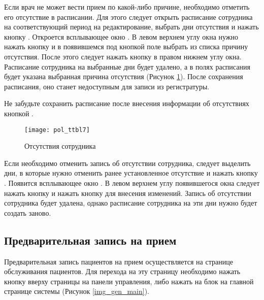 Если врач не может вести прием по какой-либо причине, необходимо отметить его отсутствие в расписании. Для этого следует открыть расписание сотрудника на соответствующий период на редактирование, выбрать дни отсутствия и нажать кнопку . Откроется всплывающее окно . В левом верхнем углу окна нужно нажать кнопку  и в появившемся под кнопкой поле выбрать из списка причину отсутствия. После этого следует нажать кнопку  в правом нижнем углу окна. Расписание сотрудника на выбранные дни будет удалено, а в полях расписания будет указана выбранная причина отсутствия (Рисунок \ref{img_pol_ttbl7}). После сохранения расписания, оно станет недоступным для записи из регистратуры.

\begin{vnim}
 Не забудьте сохранить расписание после внесения информации об отсутствиях кнопкой .
\end{vnim} 

\begin{figure}[ht]\centering
 \texttt{[image: pol\_ttbl7]}
 \caption{Отсутствия сотрудника}
 \label{img_pol_ttbl7}
\end{figure}

Если необходимо отменить запись об отсутствии сотрудника, следует выделить дни, в которые нужно отменить ранее установленное отсутствие и нажать кнопку . Появится всплывающее окно . В левом верхнем углу появившегося окна следует нажать кнопку  и нажать кнопку  для внесения изменений. Запись об отсутствии сотрудника будет удалена, однако расписание сотрудника на эти дни нужно будет создать заново. 

\subsection{Предварительная запись на прием}

Предварительная запись пациентов на прием осуществляется на странице обслуживания пациентов. Для перехода на эту страницу необходимо нажать кнопку  вверху страницы на панели управления, либо нажать на блок  на главной странице системы (Рисунок \ref{img_gen_main}).

